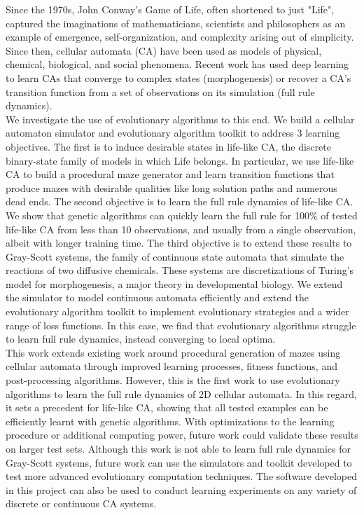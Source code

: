 
Since the 1970s, John Conway's Game of Life, often shortened to just "Life", captured the imaginations of mathematicians, scientists and philosophers as an example of emergence, self-organization, and complexity arising out of simplicity. Since then, cellular automata (CA) have been used as models of physical, chemical, biological, and social phenomena. Recent work has used deep learning to learn CAs that converge to complex states (morphogenesis)\cite{mordvintsev2020growing} or recover a CA's transition function from a set of observations on its simulation (full rule dynamics)\cite{wulff1992learning}.\\

We investigate the use of evolutionary algorithms to this end. We build a cellular automaton simulator and evolutionary algorithm toolkit to address 3 learning objectives. The first is to induce desirable states in life-like CA, the discrete binary-state family of models in which Life belongs. In particular, we use life-like CA to build a procedural maze generator and learn transition functions that produce mazes with desirable qualities like long solution paths and numerous dead ends. The second objective is to learn the full rule dynamics of life-like CA. We show that genetic algorithms can quickly learn the full rule for 100\% of tested life-like CA from less than 10 observations, and usually from a single observation, albeit with longer training time. The third objective is to extend these results to Gray-Scott systems, the family of continuous state automata that simulate the reactions of two diffusive chemicals. These systems are discretizations of Turing's model for morphogenesis, a major theory in developmental biology. We extend the simulator to model continuous automata efficiently and extend the evolutionary algorithm toolkit to implement evolutionary strategies and a wider range of loss functions. In this case, we find that evolutionary algorithms struggle to learn full rule dynamics, instead converging to local optima.\\

This work extends existing work around procedural generation of mazes using cellular automata\cite{adams2017procedural} through improved learning processes, fitness functions, and post-processing algorithms. However, this is the first work to use evolutionary algorithms to learn the full rule dynamics of 2D cellular automata. In this regard, it sets a precedent for life-like CA, showing that all tested examples can be efficiently learnt with genetic algorithms. With optimizations to the learning procedure or additional computing power, future work could validate these results on larger test sets. Although this work is not able to learn full rule dynamics for Gray-Scott systems, future work can use the simulators and toolkit developed to test more advanced evolutionary computation techniques. The software developed in this project can also be used to conduct learning experiments on any variety of discrete or continuous CA systems.\\